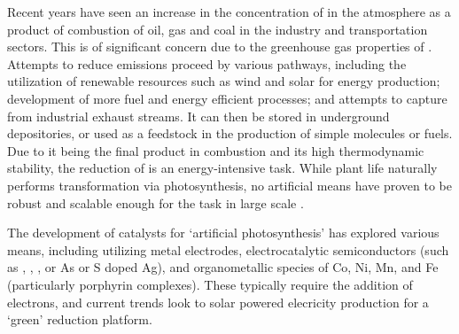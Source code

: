 Recent years have seen an increase in the concentration of  in the atmosphere as a product of combustion of oil, gas and coal in the industry and transportation sectors\autocite{song2006}. This is of significant concern due to the greenhouse gas properties of  \autocite{matthews2009, meinshausen2009}. Attempts to reduce emissions proceed by various pathways, including the utilization of renewable resources such as wind and solar for energy production\autocite{neuhoff2005}; development of more fuel and energy efficient processes; and attempts to capture  from industrial exhaust streams\autocite{peratitus2014, kadantsev2013, iremonger2011}. It can then be stored in underground depositories, or used as a feedstock in the production of simple molecules or fuels\autocite{leitner1996, olah2009, kang2012}. Due to it being the final product in combustion and its high thermodynamic stability, the reduction of  is an energy-intensive task\autocite{schwarz1989, morris2009}. While plant life naturally performs  transformation via photosynthesis, no artificial means have proven to be robust and scalable enough for the task in large scale \autocite{arakawa2001}. 

The development of catalysts for `artificial photosynthesis' has explored various means, including utilizing metal electrodes\autocite{li2010}, electrocatalytic semiconductors (such as , , , or As or S doped Ag)\autocite{inoue1971, lim2014}, and organometallic species of Co, Ni, Mn, and Fe (particularly porphyrin complexes)\autocite{fisher1980, tinnemans1984, beley1986, simonmanso2004, fujita1994, fujita1993, kimura1994, dhanasekaran1999, lacy2014, bourrez2011, sampson2014}. These typically require the addition of electrons, and current trends look to solar powered elecricity production for a `green'  reduction platform\autocite{zeng2014}.


